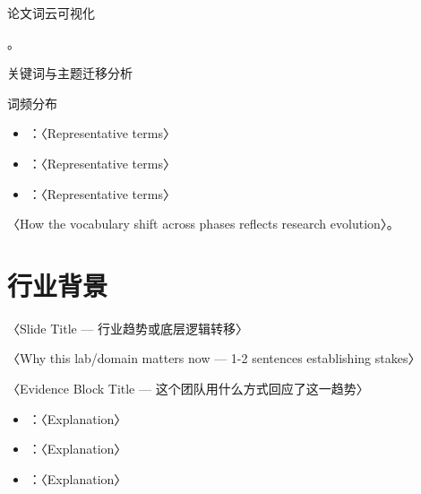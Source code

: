 \begin{frame}{论文词云可视化}
  \phfig
  \begin{callout}[说明]
    。
    \\
  \end{callout}
\end{frame}

\begin{frame}{关键词与主题迁移分析}
  \begin{block}{词频分布}
    \begin{itemize}
      \item {}：〈Representative terms〉
      \item {}：〈Representative terms〉
      \item {}：〈Representative terms〉
    \end{itemize}
  \end{block}
  \tightgap
  \begin{callout}[核心发现]
    〈How the vocabulary shift across phases reflects research evolution〉。
  \end{callout}
\end{frame}

\renewcommand{\secblurb}{〈本节一句话主旨：为什么这个实验室/研究方向值得关注〉}
\section{行业背景}

\begin{frame}{〈Slide Title — 行业趋势或底层逻辑转移〉}
  \begin{callout}
    〈Why this lab/domain matters now — 1-2 sentences establishing stakes〉
  \end{callout}
  \tightgap
  \begin{block}{〈Evidence Block Title — 这个团队用什么方式回应了这一趋势〉}
    \begin{itemize}
      \item {}：〈Explanation〉
      \item {}：〈Explanation〉
      \item {}：〈Explanation〉
    \end{itemize}
  \end{block}
\end{frame}

